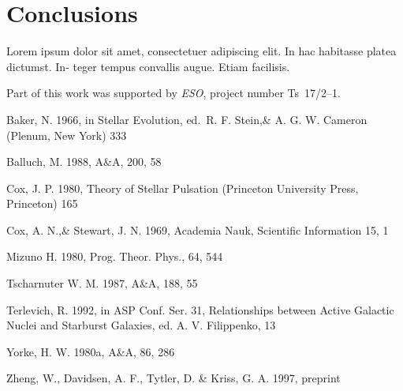 \documentclass{aa}
\begin{document}
\newpage 



\section{Conclusions}
Lorem ipsum dolor sit amet,
consectetuer adipiscing elit. In hac habitasse platea dictumst. In-
teger tempus convallis augue. Etiam facilisis.

\begin{acknowledgements}
      Part of this work was supported by \emph{ESO}, project
      number Ts~17/2--1.
\end{acknowledgements}




%

\begin{thebibliography}{}

   Baker, N. 1966,
      in Stellar Evolution,
      ed.\ R. F. Stein,\& A. G. W. Cameron
      (Plenum, New York) 333

    Balluch, M. 1988,
      A\&A, 200, 58

    Cox, J. P. 1980,
      Theory of Stellar Pulsation
      (Princeton University Press, Princeton) 165

    Cox, A. N.,\& Stewart, J. N. 1969,
      Academia Nauk, Scientific Information 15, 1

    Mizuno H. 1980,
      Prog. Theor. Phys., 64, 544
   
    Tscharnuter W. M. 1987,
      A\&A, 188, 55
  
    Terlevich, R. 1992, in ASP Conf. Ser. 31,
      Relationships between Active Galactic Nuclei and Starburst Galaxies,
      ed. A. V. Filippenko, 13

    Yorke, H. W. 1980a,
      A\&A, 86, 286

    Zheng, W., Davidsen, A. F., Tytler, D. \& Kriss, G. A.
      1997, preprint
\end{thebibliography}
\end{document}
